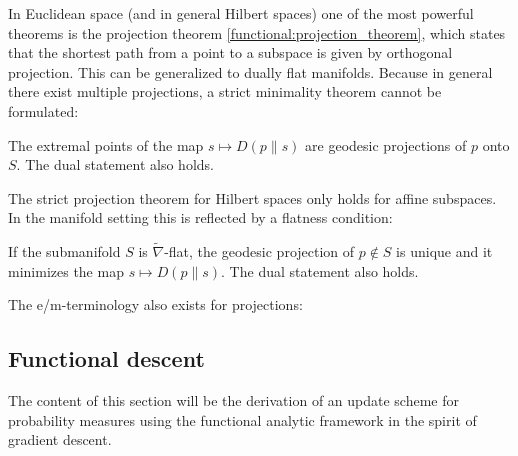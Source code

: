     In Euclidean space (and in general Hilbert spaces) one of the most powerful theorems is the projection theorem \ref{functional:projection_theorem}, which states that the shortest path from a point to a subspace is given by orthogonal projection. This can be generalized to dually flat manifolds.
    Because in general there exist multiple projections, a strict minimality theorem cannot be formulated:
    \begin{theorem}
        The extremal points of the map $s\mapsto D(p\|s)$ are geodesic projections of $p$ onto $S$. The dual statement also holds.
    \end{theorem}
    The strict projection theorem for Hilbert spaces only holds for affine subspaces. In the manifold setting this is reflected by a flatness condition:
    \begin{property}
        If the submanifold $S$ is $\widetilde{\nabla}$-flat, the geodesic projection of $p\not\in S$ is unique and it minimizes the map $s\mapsto D(p\|s)$. The dual statement also holds.
    \end{property}

    The e/m-terminology also exists for projections:

\subsection{Functional descent}

    The content of this section will be the derivation of an update scheme for probability measures using the functional analytic framework in the spirit of gradient descent. %

